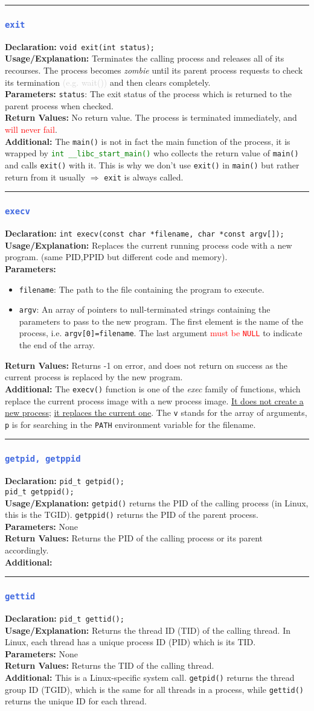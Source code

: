 \documentclass[openany,12pt]{book}
\newcommand{\code}[1]{\texttt{#1}}
\newcommand{\red}[1]{\textcolor{red}{#1}}
\newcommand{\blue}[1]{\textcolor{RoyalBlue}{#1}}
\newcommand{\gray}[1]{\textcolor{lightgray}{#1}}
\newcommand{\green}[1]{\textcolor{Green}{#1}}
\newcommand{\functionEntry}[6]{%
  \noindent\rule{\linewidth}{0.5pt}
  \subsubsection*{\blue{\large{\texttt{#1}}}}
  \textbf{Declaration:} \texttt{#2} \\
  \textbf{Usage/Explanation:} #3 \\
  \textbf{Parameters:} #4 \\
  \textbf{Return Values:} #5 \\
  \textbf{Additional:} #6
  \vspace{1em}
}
\newcommand{\functionEntryPar}[6]{%
  \noindent\rule{\linewidth}{0.5pt}
  \subsubsection*{\blue{\large{\texttt{#1}}}}
  \textbf{Declaration:} \texttt{#2} \\
  \textbf{Usage/Explanation:} #3 \\
  \textbf{Parameters:}
  \begin{itemize}[leftmargin=*]
    #4
  \end{itemize}
  \textbf{Return Values:} #5 \\
  \textbf{Additional:} #6
  \vspace{1em}
}
\begin{document}
\functionEntry{exit}
{void exit(int status);}
{Terminates the calling process and releases all of its recourses. The process becomes \textit{zombie} until its parent process requests to check its termination \gray{(e.g. wait())} and then clears completely.}
{\code{status}: The exit status of the process which is returned to the parent process when checked.}
{No return value. The process is terminated immediately, and \red{will never fail}.}
{The \code{main()} is not in fact the main function of the process, it is wrapped by \green{\code{int \_\_libc\_start\_main()}} who collects the return value of \code{main()} and calls \code{exit()} with it. This is why we don't use \code{exit()} in \code{main()} but rather return from it usually $\Longrightarrow$ \code{exit} is always called.\label{func:exit}}



\functionEntryPar{execv}
{int execv(const char *filename, char *const argv[]);}
{Replaces the current running process code with a new program. (same PID,PPID but different code and memory).}
{\item \code{filename}: The path to the file containing the program to execute.
  \item \code{argv}: An array of pointers to null-terminated strings containing the parameters to pass to the new program. The first element is the name of the process, i.e. \code{argv[0]=filename}. The last argument \red{must be \code{NULL}} to indicate the end of the array.}
{Returns -1 on error, and does not return on success as the current process is replaced by the new program.}
{The \code{execv()} function is one of the \textit{exec} family of functions, which replace the current process image with a new process image. \underline{It does not create a new process;} \underline{it replaces the current one}. The \code{v} stands for the array of arguments, \code{p} is for searching in the \code{PATH} environment variable for the filename. \label{func:execv}}


\functionEntry{getpid, getppid}
{pid\_t getpid();\\ pid\_t getppid();}
{\code{getpid()} returns the PID of the calling process (in Linux, this is the TGID). \code{getppid()} returns the PID of the parent process.}
{None}
{Returns the PID of the calling process or its parent accordingly.}
{\label{func:getpid}}

\functionEntry{gettid}
{pid\_t gettid();}
{Returns the thread ID (TID) of the calling thread. In Linux, each thread has a unique process ID (PID) which is its TID.}
{None}
{Returns the TID of the calling thread.}
{This is a Linux-specific system call. \code{getpid()} returns the thread group ID (TGID), which is the same for all threads in a process, while \code{gettid()} returns the unique ID for each thread.\label{func:gettid}}
\end{document}

